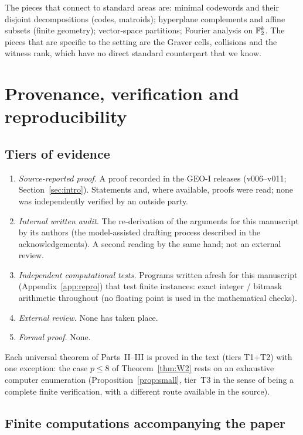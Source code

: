 The pieces that connect to standard areas are: minimal codewords and their disjoint decompositions (codes, matroids); hyperplane complements and affine subsets (finite geometry); vector-space partitions; Fourier analysis on $\mathbb F_2^k$. The pieces that are specific to the setting are the Graver cells, collisions and the witness rank, which have no direct standard counterpart that we know.

\section{Provenance, verification and reproducibility}\label{sec:prov}

\subsection{Tiers of evidence}

\begin{enumerate}[label=\textbf{T\arabic*.},leftmargin=*]
\item \emph{Source-reported proof.} A proof recorded in the GEO-I releases (v006--v011; Section~\ref{sec:intro}). Statements and, where available, proofs were read; none was independently verified by an outside party.
\item \emph{Internal written audit.} The re-derivation of the arguments for this manuscript by its authors (the model-assisted drafting process described in the acknowledgements). A second reading by the same hand; not an external review.
\item \emph{Independent computational tests.} Programs written afresh for this manuscript (Appendix~\ref{app:repro}) that test finite instances: exact integer / bitmask arithmetic throughout (no floating point is used in the mathematical checks).
\item \emph{External review.} None has taken place.
\item \emph{Formal proof.} None.
\end{enumerate}

Each universal theorem of Parts~II--III is proved in the text (tiers T1+T2) with one exception: the case $p\le8$ of Theorem~\ref{thm:W2} rests on an exhaustive computer enumeration (Proposition~\ref{prop:small}, tier~T3 in the sense of being a complete finite verification, with a different route available in the source).

\subsection{Finite computations accompanying the paper}

